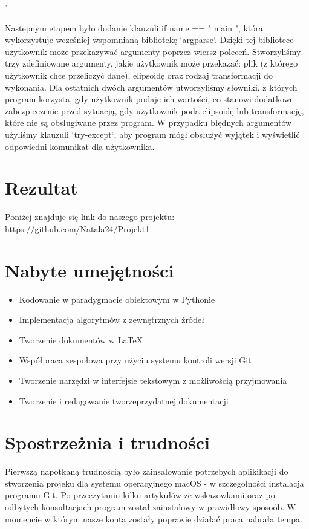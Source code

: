 '\documentclass[a4paper,12pt]{article}
\begin{document}
Następnym etapem było dodanie klauzuli if name == " main ", która wykorzystuje wcześniej wspomnianą bibliotekę `argparse`. Dzięki tej bibliotece użytkownik może przekazywać argumenty poprzez wiersz poleceń. Stworzyliśmy trzy zdefiniowane argumenty, jakie użytkownik może przekazać: plik (z którego użytkownik chce przeliczyć dane), elipsoidę oraz rodzaj transformacji do wykonania. Dla ostatnich dwóch argumentów utworzyliśmy słowniki, z których program korzysta, gdy użytkownik podaje ich wartości, co stanowi dodatkowe zabezpieczenie przed sytuacją, gdy użytkownik poda elipsoidę lub transformację, które nie są obsługiwane przez program. W przypadku błędnych argumentów użyliśmy klauzuli `try-except`, aby program mógł obsłużyć wyjątek i wyświetlić odpowiedni komunikat dla użytkownika.

\section{Rezultat}
Poniżej znajduje się link do naszego projektu: \\
https://github.com/Natala24/Projekt1

\section{Nabyte umejętności}

\begin{itemize}
\item Kodowanie w paradygmacie obiektowym w Pythonie
\item Implementacja algorytmów z zewnętrznych źródeł
\item Tworzenie dokumentów w LaTeX
\item Współpraca zespołowa przy użyciu systemu kontroli wersji Git
\item Tworzenie narzędzi w interfejsie tekstowym z możliwością przyjmowania   
\item Tworzenie i redagowanie tworzeprzydatnej dokumentacji
 \end{itemize}

\section{Spostrzeżnia i trudności}

Pierwszą napotkaną trudnością było zainsalowanie potrzebych aplikikacji do stworzenia projeku dla systemu operacyjnego macOS - w szczegolności instalacja programu Git. Po przeczytaniu kilku artykułów ze wskazowkami oraz po odbytych konsultacjach program został zainstalowy w prawidłowy sposoób. W momencie w którym  nasze konta zostały poprawie działać praca nabrała tempa. \\
\end{document}
